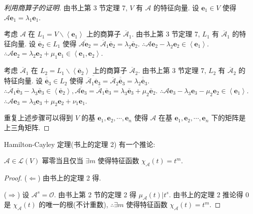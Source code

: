 \documentclass[color=black,device=normal,lang=cn,mode=geye]{elegantnote}
\begin{document}
\begin{proof}[利用商算子的证明]
    由书上第 3 节定理 7, $V$ 有 $\mathcal{A}$ 的特征向量. 设 $\boldsymbol{e}_1\in V$ 使得 $\mathcal{A}\boldsymbol{e}_1=\lambda_1\boldsymbol{e}_1$.

    考虑 $\mathcal{A}$ 在 $L_1=V\backslash\left<\boldsymbol{e}_1\right>$ 上的商算子 $\overline{\mathcal{A}}_1$. 由书上第 3 节定理 7, $L_1$ 有 $\overline{\mathcal{A}}_1$ 的特征向量. 设 $\overline{\boldsymbol{e}}_2\in L_1$ 使得 $\overline{\mathcal{A}\boldsymbol{e}_2}=\overline{\mathcal{A}}_1\overline{\boldsymbol{e}}_2=\lambda_2\overline{\boldsymbol{e}}_2$. $\therefore\mathcal{A}\boldsymbol{e}_2-\lambda_2\boldsymbol{e}_2\in\left<\boldsymbol{e}_1\right>$. $\therefore\mathcal{A}\boldsymbol{e}_2=\lambda_2\boldsymbol{e}_2+\mu_1\boldsymbol{e}_1\in\left<\boldsymbol{e}_1,\boldsymbol{e}_2\right>$.

    考虑 $\overline{\mathcal{A}}_1$ 在 $L_2=L_1\backslash\left<\overline{\boldsymbol{e}}_2\right>$ 上的商算子 $\overline{\mathcal{A}}_2$. 由书上第 3 节定理 7, $L_2$ 有 $\overline{\mathcal{A}}_2$ 的特征向量. 设 $\overline{\overline{\boldsymbol{e}}}_3\in L_2$ 使得 $\overline{\overline{\mathcal{A}}_1\overline{\boldsymbol{e}}_3}=\overline{\mathcal{A}}_2\overline{\overline{\boldsymbol{e}}}_3=\lambda_2\overline{\overline{\boldsymbol{e}}}_3$. $\therefore\overline{\mathcal{A}}_1\overline{\boldsymbol{e}}_3-\lambda_3\overline{\boldsymbol{e}}_3\in\left<\overline{\boldsymbol{e}}_2\right>,\overline{\mathcal{A}\boldsymbol{e}_3}=\overline{\mathcal{A}}_1\overline{\boldsymbol{e}}_3=\lambda_3\overline{\boldsymbol{e}}_3+\mu_2\overline{\boldsymbol{e}}_2$. $\therefore\mathcal{A}\boldsymbol{e}_3-\lambda_3\boldsymbol{e}_3-\mu_2\boldsymbol{e}_2\in\left<\boldsymbol{e}_1\right>$. $\therefore\mathcal{A}\boldsymbol{e}_3=\lambda_3\boldsymbol{e}_3+\mu_2\boldsymbol{e}_2+\nu_1\boldsymbol{e}_1$.

    重复上述步骤可以得到 $V$ 的基 $\boldsymbol{e}_1,\boldsymbol{e}_2,\cdots,\boldsymbol{e}_n$ 使得 $\mathcal{A}$ 在基 $\boldsymbol{e}_1,\boldsymbol{e}_2,\cdots,\boldsymbol{e}_n$ 下的矩阵是上三角矩阵.
\end{proof}
Hamilton-Cayley 定理(书上的定理 2) 有一个推论:
\begin{corollary}\label{c4.1}
    $\mathcal{A}\in\mathcal{L}(V)$ 幂零当且仅当 $\exists m$ 使得特征函数 $\chi_{\mathcal{A}}(t)=t^m$.
\end{corollary}
\begin{proof}
    ($\Leftarrow$) 由书上的定理 2 得.

    ($\Rightarrow$) 设 $\mathcal{A}^s=\mathcal{O}$. 由书上第 2 节的定理 2 得 $\mu_\mathcal{A}(t)|t^s$. 由书上的定理 2 推论得 $0$ 是 $\chi_{\mathcal{A}}(t)$ 的唯一的根(不计重数), $\therefore\exists m$ 使得特征函数 $\chi_{\mathcal{A}}(t)=t^m$.
\end{proof}
\end{document}
